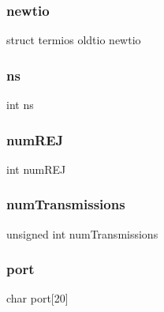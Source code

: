 \subsubsection{\texorpdfstring{newtio}{newtio}}
{\footnotesize\ttfamily struct termios oldtio newtio}

\hypertarget{struct_link_layer_a8e83bd7735d1f2d707f5d341c8e61d1e}{}\label{struct_link_layer_a8e83bd7735d1f2d707f5d341c8e61d1e} 
\subsubsection{\texorpdfstring{ns}{ns}}
{\footnotesize\ttfamily int ns}

\hypertarget{struct_link_layer_aa4d6e890dc476e1b417da6dbce703010}{}\label{struct_link_layer_aa4d6e890dc476e1b417da6dbce703010} 
\subsubsection{\texorpdfstring{num\+R\+EJ}{numREJ}}
{\footnotesize\ttfamily int num\+R\+EJ}

\hypertarget{struct_link_layer_ac032302ea4696263706fe7dd32e6e4bc}{}\label{struct_link_layer_ac032302ea4696263706fe7dd32e6e4bc} 
\subsubsection{\texorpdfstring{num\+Transmissions}{numTransmissions}}
{\footnotesize\ttfamily unsigned int num\+Transmissions}

\hypertarget{struct_link_layer_a1bf41122fd2e6f904119473794d4f52b}{}\label{struct_link_layer_a1bf41122fd2e6f904119473794d4f52b} 
\subsubsection{\texorpdfstring{port}{port}}
{\footnotesize\ttfamily char port\mbox{[}20\mbox{]}}

\hypertarget{struct_link_layer_a6e27f49150e9a14580fb313cc2777e00}{}\label{struct_link_layer_a6e27f49150e9a14580fb313cc2777e00} 
